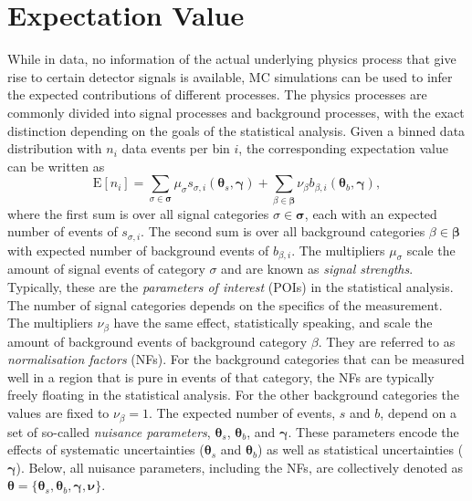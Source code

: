 \section{Expectation Value}
\label{sec:exp-value}
While in data, no information of the actual underlying physics process that give rise to certain detector signals is available, MC simulations can be used to infer the expected contributions of different processes.
The physics processes are commonly divided into signal processes and background processes, with the exact distinction depending on the goals of the statistical analysis.
Given a binned data distribution with $n_i$ data events per bin $i$, the corresponding expectation value can be written as
\begin{equation}
    \text{E}[n_i] = \sum_{\sigma \in \pmb{\sigma}} \mu_\sigma s_{\sigma,i}(\pmb{\theta}_s, \pmb{\gamma}) + \sum_{\beta \in \pmb{\beta}} \nu_\beta b_{\beta,i}(\pmb{\theta}_b, \pmb{\gamma}),
\end{equation}
where the first sum is over all signal categories $\sigma \in \pmb{\sigma}$, each with an expected number of events of $s_{\sigma, i}$. The second sum is over all background categories $\beta \in \pmb{\beta}$ with expected number of background events of $b_{\beta,i}$.
The multipliers $\mu_\sigma$ scale the amount of signal events of category $\sigma$ and are known as \emph{signal strengths}. Typically, these are the \emph{parameters of interest} (POIs) in the statistical analysis. The number of signal categories depends on the specifics of the measurement. The multipliers $\nu_\beta$ have the same effect, statistically speaking, and scale the amount of background events of background category $\beta$. They are referred to as \emph{normalisation factors} (NFs). For the background categories that can be measured well in a region that is pure in events of that category, the NFs are typically freely floating in the statistical analysis. For the other background categories the values are fixed to $\nu_\beta = 1$. 
The expected number of events, $s$ and $b$, depend on a set of so-called \emph{nuisance parameters}, $\pmb{\theta}_s$, $\pmb{\theta}_b$, and $\pmb{\gamma}$. These parameters encode the effects of systematic uncertainties ($\pmb{\theta}_s$ and $\pmb{\theta}_b$) as well as statistical uncertainties ($\pmb{\gamma}$). Below, all nuisance parameters, including the NFs, are collectively denoted as $\pmb{\theta} = \{\pmb{\theta}_s, \pmb{\theta}_b, \pmb{\gamma}, \pmb{\nu}\}$. 

